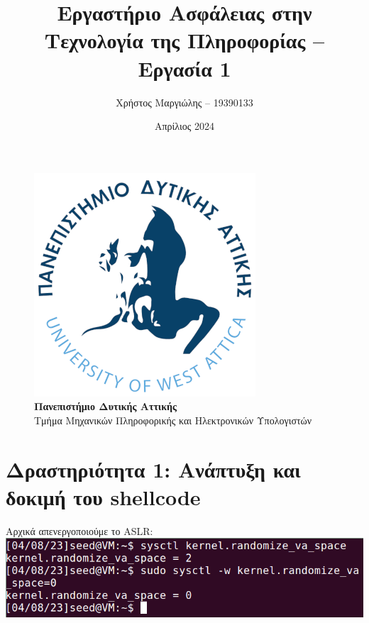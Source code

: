 \documentclass[12pt]{article}
\title{Εργαστήριο Ασφάλειας στην Τεχνολογία της Πληροφορίας -- Εργασία 1}
\author{Χρήστος Μαργιώλης -- 19390133}
\date{Απρίλιος 2024}
\begin{document}
\begin{titlepage}
        \maketitle
        \begin{figure}[t!]
        \begin{center}
        \includegraphics[scale=0.3]{./res/uniwalogo.png} \\
        \Large
        \textbf{Πανεπιστήμιο Δυτικής Αττικής} \\
        \large
        Τμήμα Μηχανικών Πληροφορικής και Ηλεκτρονικών Υπολογιστών
        \end{center}
        \end{figure}
\end{titlepage}

\renewcommand{\contentsname}{Περιεχόμενα}
\tableofcontents
\pagebreak

\section{Δραστηριότητα 1: Ανάπτυξη και δοκιμή του shellcode}

Αρχικά απενεργοποιούμε το ASLR: \\

\includegraphics[width=\textwidth]{res/aslr.png} \\
\end{document}
